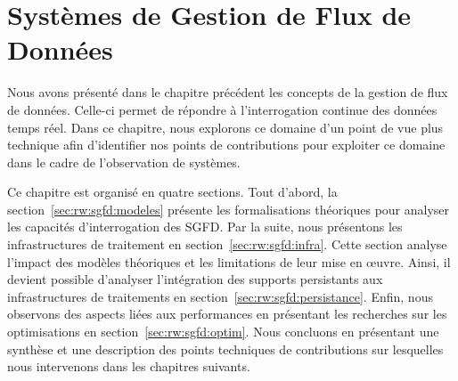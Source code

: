 
\chapter{Systèmes de Gestion de Flux de Données}\label{chap:rw:sgfd}
\chaptertoc
Nous avons présenté dans le chapitre précédent les concepts de la gestion de flux de données. Celle-ci permet de répondre à l'interrogation continue des données temps réel. Dans ce chapitre, nous explorons ce domaine d'un point de vue plus technique afin d'identifier nos points de contributions pour exploiter ce domaine dans le cadre de l'observation de systèmes.

Ce chapitre est organisé en quatre sections. Tout d'abord, la section~\ref{sec:rw:sgfd:modeles} présente les formalisations théoriques pour analyser les capacités d'interrogation des SGFD. Par la suite, nous présentons les infrastructures de traitement en section~\ref{sec:rw:sgfd:infra}. Cette section analyse l'impact des modèles théoriques et les limitations de leur mise en œuvre. Ainsi, il devient possible d'analyser l'intégration des supports persistants aux infrastructures de traitements en section~\ref{sec:rw:sgfd:persistance}. Enfin, nous observons des aspects liées aux performances en présentant les recherches sur les optimisations en section~\ref{sec:rw:sgfd:optim}. Nous concluons en présentant une synthèse et une description des points techniques de contributions sur lesquelles nous intervenons dans les chapitres suivants.






